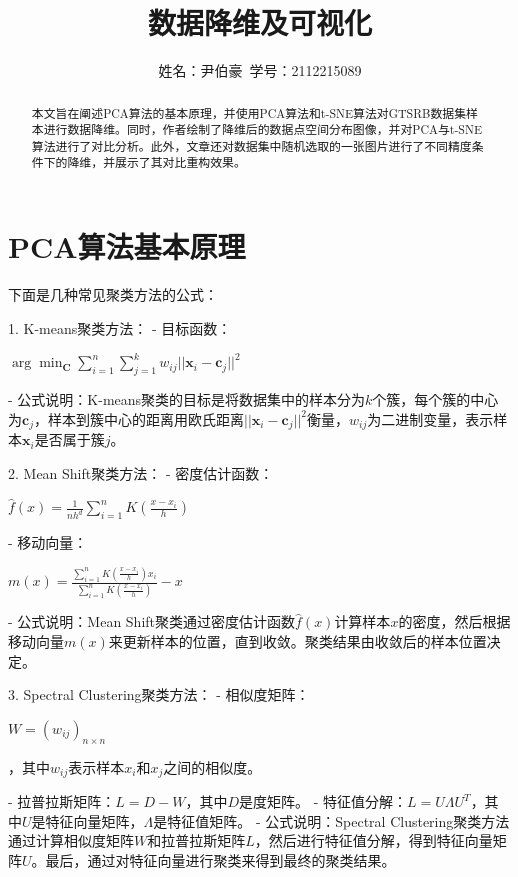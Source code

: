 \documentclass[lettersize,journal]{IEEEtran}
\begin{document}
\title{数据降维及可视化}
\author{姓名：尹伯豪\ 学号：2112215089}



\maketitle

\begin{abstract}
本文旨在阐述PCA算法的基本原理，并使用PCA算法和t-SNE算法对GTSRB数据集样本进行数据降维。同时，作者绘制了降维后的数据点空间分布图像，并对PCA与t-SNE算法进行了对比分析。此外，文章还对数据集中随机选取的一张图片进行了不同精度条件下的降维，并展示了其对比重构效果。
\end{abstract}



\section{PCA算法基本原理}

下面是几种常见聚类方法的公式：

1. K-means聚类方法：
   - 目标函数：
   
   $\arg\min_{\mathbf{C}} \sum_{i=1}^{n} \sum_{j=1}^{k} w_{ij} ||\mathbf{x}_i - \mathbf{c}_j||^2$
   
   - 公式说明：K-means聚类的目标是将数据集中的样本分为$k$个簇，每个簇的中心为$\mathbf{c}_j$，样本到簇中心的距离用欧氏距离$||\mathbf{x}_i - \mathbf{c}_j||^2$衡量，$w_{ij}$为二进制变量，表示样本$\mathbf{x}_i$是否属于簇$j$。

2. Mean Shift聚类方法：
   - 密度估计函数：
   
   $\hat{f}(x) = \frac{1}{nh^d} \sum_{i=1}^{n} K\left(\frac{x - x_i}{h}\right)$
   
   - 移动向量：
   
   $m(x) = \frac{\sum_{i=1}^{n} K\left(\frac{x - x_i}{h}\right) x_i}{\sum_{i=1}^{n} K\left(\frac{x - x_i}{h}\right)} - x$
   
   - 公式说明：Mean Shift聚类通过密度估计函数$\hat{f}(x)$计算样本$x$的密度，然后根据移动向量$m(x)$来更新样本的位置，直到收敛。聚类结果由收敛后的样本位置决定。

3. Spectral Clustering聚类方法：
   - 相似度矩阵：
   
   $W = (w_{ij})_{n \times n}$
   
   ，其中$w_{ij}$表示样本$x_i$和$x_j$之间的相似度。
   
   - 拉普拉斯矩阵：$L = D - W$，其中$D$是度矩阵。
   - 特征值分解：$L = U \Lambda U^T$，其中$U$是特征向量矩阵，$\Lambda$是特征值矩阵。
   - 公式说明：Spectral Clustering聚类方法通过计算相似度矩阵$W$和拉普拉斯矩阵$L$，然后进行特征值分解，得到特征向量矩阵$U$。最后，通过对特征向量进行聚类来得到最终的聚类结果。
\end{document}
